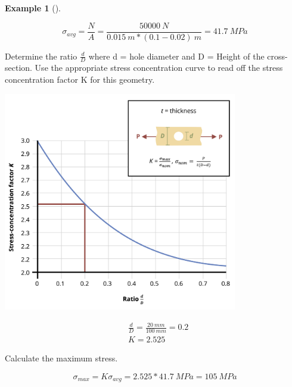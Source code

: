 \documentclass[
  letterpaper,
  DIV=11,
  numbers=noendperiod]{scrreprt}
\theoremstyle{definition}
\newtheorem{example}{Example}[chapter]
\theoremstyle{remark}
\begin{document}
\begin{tcolorbox}
\begin{example}[]
\begin{tcolorbox}
\[
\sigma_{a v g}=\frac{N}{A}=\frac{50000{~N}}{0.015{~m} *(0.1-0.02){~m}}=41.7{~MPa}
\]

Determine the ratio \(\frac{d}{D}\) where d = hole diameter and D =
Height of the cross-section. Use the appropriate stress concentration
curve to read off the stress concentration factor K for this geometry.

\begin{center}
\includegraphics[width=4.02083in,height=\textheight]{images/PNGs/Example 5.1 part 3.png}
\end{center}

\[
\begin{aligned}
&\frac{d}{D}=\frac{20{~mm}}{100{~mm}}=0.2\\
&K=2.525
\end{aligned}
\]

Calculate the maximum stress.

\[
\sigma_{max }=K \sigma_{avg}=2.525*41.7{~MPa}=105{~MPa}
\]

\end{tcolorbox}

\end{example}

\end{tcolorbox}
\end{document}
